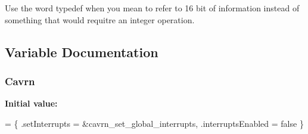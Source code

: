 Use the word typedef when you mean to refer to 16 bit of information instead of something that would requitre an integer operation. 



\subsection{Variable Documentation}
\hypertarget{a00011_a1790b0cf365be58885af424fb01ecd50}{
\subsubsection[{Cavrn}]{ {\bf Cavrn}\hspace{0.3cm}{\ttfamily [static]}}}\label{a00011_a1790b0cf365be58885af424fb01ecd50}
{\bfseries Initial value\-:}
\begin{DoxyCode}
= \{
  .setInterrupts = &cavrn\_set\_global\_interrupts,
  .interruptsEnabled = \textcolor{keyword}{false}
\}
\end{DoxyCode}
